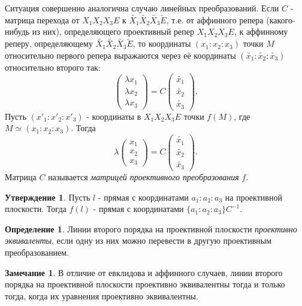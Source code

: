 \documentclass[a4paper, 12pt]{article}
\theoremstyle{definition}
\newtheorem*{definition}{Определение}
\newtheorem*{subtheorem}{Утверждение}
\newtheorem*{remark}{Замечание}
\begin{document}
Ситуация совершенно аналогична случаю линейных преобразований. Если $C$ - матрица перехода от $X_1X_2X_3E$ к $\tilde{X_1}\tilde{X_2}\tilde{X_3}\tilde{E}$, т.е. от аффинного репера (какого-нибудь из них), определяющего проективный репер $X_1X_2X_3E$, к аффинному реперу, определяющему $\tilde{X_1}\tilde{X_2}\tilde{X_3}\tilde{E}$, то координаты $(x_1 : x_2 : x_3)$ точки $M$ относительно первого репера выражаются через её координаты $(\tilde{x_1} : \tilde{x_2} : \tilde{x_3})$ относительно второго так:
\[ \begin{pmatrix}
    \lambda x_1 \\
    \lambda x_2 \\
    \lambda x_3
\end{pmatrix} = C
\begin{pmatrix}
    \tilde{x_1} \\
    \tilde{x_2} \\
    \tilde{x_3}
\end{pmatrix}.
\]
Пусть $(x'_1 : x'_2 : x'_3)$ - координаты в $X_1X_2X_3E$  точки $f(M)$, где $M\simeq (x_1 : x_2 : x_3)$. Тогда
\[ \lambda \begin{pmatrix}
    x_1 \\
    x_2 \\
    x_3
\end{pmatrix} = C
\begin{pmatrix}
    \tilde{x_1} \\
    \tilde{x_2} \\
    \tilde{x_3}
\end{pmatrix}.
\]
Матрица $C$ называется \textit{матрицей проективного преобразования} $f$.

\begin{subtheorem}
    Пусть $l$ - прямая с координатами ${a_1 : a_2 : a_3}$ на проективной плоскости. Тогда $f(l)$ - прямая с координатами $\{a_1 : a_2 : a_3\}C^{-1}$.
\end{subtheorem}

\begin{definition}
    Линии второго порядка на проективной плоскости \textit{проективно эквиваленты}, если одну из них можно перевести в другую проективным преобразованием.
\end{definition}

\begin{remark}
    В отличие от евклидова и аффинного случаев, линии второго порядка на проективной плоскости проективно эквивалентны тогда и только тогда, когда их уравнения проективно эквивалентны.
\end{remark}
\end{document}
